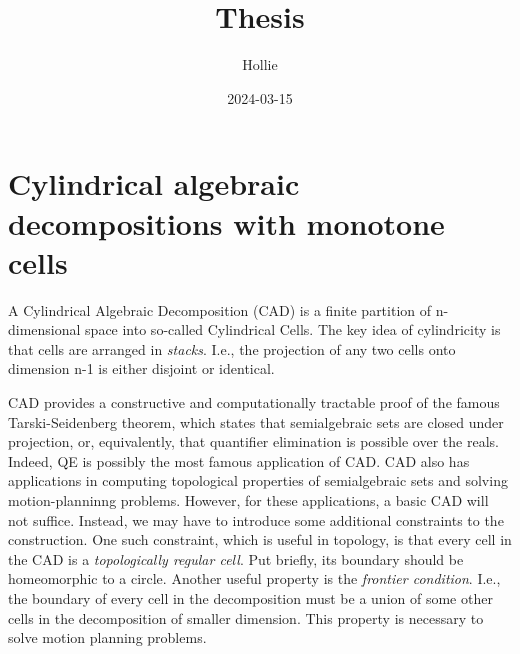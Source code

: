 \documentclass[
]{book}
\title{Thesis}
\author{Hollie}
\date{2024-03-15}
\theoremstyle{definition}
\theoremstyle{definition}
\theoremstyle{definition}
\theoremstyle{definition}
\theoremstyle{remark}
\begin{document}
\maketitle

{
\setcounter{tocdepth}{1}
\tableofcontents
}
\newcommand{\R}{\mathbb{R}}
\newcommand{\Q}{\mathbb{Q}}
\newcommand{\N}{\mathbb{N}}
\newcommand{\Z}{\mathbb{Z}}
\newcommand{\A}{\mathbb{A}}

\newcommand{\sign}{\operatorname{sign}}
\newcommand{\proj}{\operatorname{proj}}
\newcommand{\lcm}{\operatorname{lcm}}
\newcommand{\lc}{\operatorname{lc}}
\newcommand{\lm}{\operatorname{lm}}
\newcommand{\ldt}{\operatorname{lt}}
\newcommand{\multideg}{\operatorname{multideg}}
\newcommand{\red}{\operatorname{red}}
\newcommand{\prim}{\operatorname{prim}}
\newcommand{\psrc}{\operatorname{psrc}}
\newcommand{\res}{\operatorname{Res}}
\newcommand{\lex}{<_{\rm{lex}}}
\newcommand{\lexeq}{\le_{\rm{lex}}}
\newcommand{\projop}[1]{{\proj_{\R^{#1}}}}

\newcommand{\projops}[1]{{\proj_{\opspan{#1}}}}
\newcommand{\opspan}[1]{{\operatorname{span} \{#1\}}}
\newcommand{\cl}[1]{{\operatorname{cl} \left( #1 \right)}}
\newcommand{\cls}[2]{{\operatorname{cl}_{#1} \left( #2 \right)}}
\newcommand{\fr}[1]{{\operatorname{fr} \left( #1 \right)}}
\newcommand{\frt}[2]{{\operatorname{fr}_{#1} \left( #2 \right)}}

\hypertarget{cylindrical-algebraic-decompositions-with-monotone-cells}{%
\chapter{Cylindrical algebraic decompositions with monotone cells}\label{cylindrical-algebraic-decompositions-with-monotone-cells}}

A Cylindrical Algebraic Decomposition (CAD) is a finite partition of n-dimensional space into so-called Cylindrical Cells. The
key idea of cylindricity is that cells are arranged in \emph{stacks}. I.e., the projection of any two cells onto dimension
n-1 is either disjoint or identical.

CAD provides a constructive and computationally tractable proof of the famous Tarski-Seidenberg theorem, which states that semialgebraic sets are
closed under projection, or, equivalently, that quantifier elimination is possible over the reals. Indeed, QE is
possibly the most famous application of CAD. CAD also has applications in computing topological properties of
semialgebraic sets and solving motion-planninng problems. However, for these applications, a basic CAD will not suffice.
Instead, we may have to introduce some additional constraints to the construction. One such constraint, which is useful
in topology, is that every cell in the CAD is a \emph{topologically regular cell}. Put briefly, its boundary should be
homeomorphic to a circle. Another useful property is the \emph{frontier condition}. I.e., the boundary of every cell in the
decomposition must be a union of some other cells in the decomposition of smaller dimension. This property is necessary
to solve motion planning problems.
\end{document}
